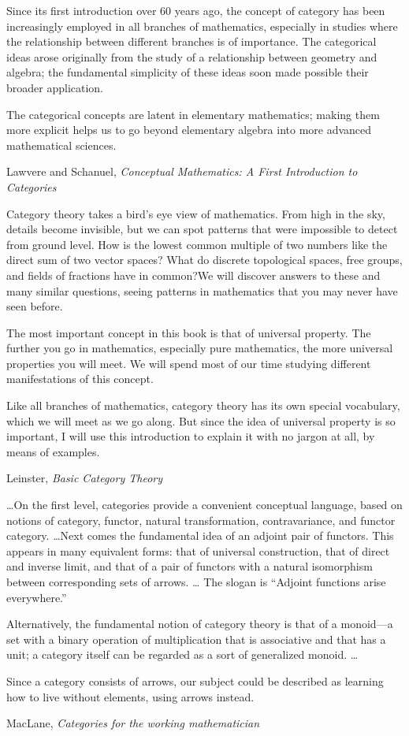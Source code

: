 \documentclass[11pt,openany]{article}
\begin{document}
\epigraph{Since its first introduction over 60 years ago, the concept of category has been
increasingly employed in all branches of mathematics, especially in studies where the
relationship between different branches is of importance. The categorical ideas arose
originally from the study of a relationship between geometry and algebra; the
fundamental simplicity of these ideas soon made possible their broader application.
\par
The categorical concepts are latent in elementary mathematics; making them more
explicit helps us to go beyond elementary algebra into more advanced mathematical
sciences.}
{Lawvere and Schanuel, 
\textit{Conceptual Mathematics: 
A First Introduction to Categories}~\cite{lawvere-schanuel-2009}}

\pagebreak
\epigraph{Category theory takes a bird’s eye view of mathematics. From high in the sky,
details become invisible, but we can spot patterns that were impossible to detect
from ground level. How is the lowest common multiple of two numbers
like the direct sum of two vector spaces? What do discrete topological spaces,
free groups, and fields of fractions have in common?We will discover answers
to these and many similar questions, seeing patterns in mathematics that you
may never have seen before.
\par
The most important concept in this book is that of universal property. The
further you go in mathematics, especially pure mathematics, the more universal
properties you will meet. We will spend most of our time studying different
manifestations of this concept.
\par
Like all branches of mathematics, category theory has its own special vocabulary,
which we will meet as we go along. But since the idea of universal
property is so important, I will use this introduction to explain it with no jargon
at all, by means of examples.}
{Leinster, \textit{Basic Category Theory}~\cite{leinster-2016-basic-category-theory}}

\epigraph{\ldots On the first level, categories provide
a convenient conceptual language, based on notions of category, 
functor, natural transformation, contravariance, and
functor category.
\ldots Next comes the fundamental idea of an adjoint pair of functors.
This appears in many equivalent forms: that of universal construction,
that of direct and inverse limit, 
and that of a pair of functors with a natural isomorphism between
corresponding sets of arrows. \ldots
The slogan is ``Adjoint functions arise everywhere.''
\par
Alternatively, the fundamental notion of category theory is that
of a monoid---a set with a binary operation of multiplication
that is associative and that has a unit;
a category itself can be regarded as a sort of generalized monoid.
\ldots
\par
Since a category consists of arrows, our subject could be 
described as learning how to live without elements, using arrows
instead.
}
{MacLane, \textit{Categories for the working
mathematician}~\cite{maclane-1998-working-mathematician}}
\end{document}
